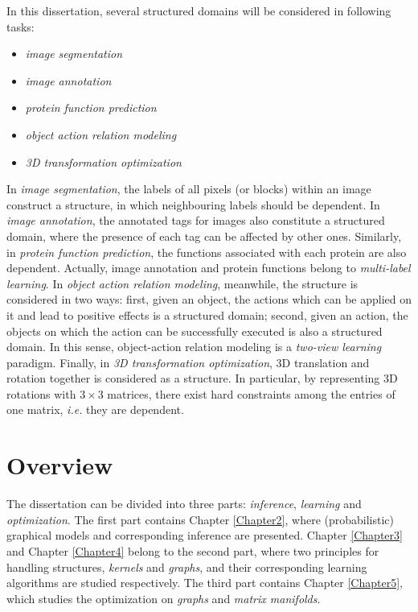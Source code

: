 In this dissertation, several structured domains will be considered in following tasks:  
\begin{itemize}
	\item \emph{image segmentation}
	\item \emph{image annotation}
	\item \emph{protein function prediction}
	\item \emph{object action relation modeling}
	\item \emph{3D transformation optimization} 
\end{itemize}
In \emph{image segmentation}, the labels of all pixels (or blocks) within an image construct a structure, in which neighbouring labels should be dependent.  
In \emph{image annotation}, the annotated tags for images also constitute a structured domain, where the presence of each tag can be affected by other ones.       
Similarly, in \emph{protein function prediction}, the functions associated with each protein are also dependent. Actually, image annotation and 
protein functions belong to \emph{multi-label learning}. In \emph{object action relation modeling}, meanwhile, the structure is 
considered in two ways: first, given an object, the actions which can be applied on it and lead to positive effects is a structured domain; second, given an action, 
the objects on which the action can be successfully executed is also a structured domain. In this sense, object-action relation modeling is  
a \emph{two-view learning} paradigm. Finally, in \emph{3D transformation optimization},  3D translation and rotation together is considered  
as a structure. In particular, by representing 3D rotations with $3\times 3$ matrices, there exist hard constraints among the entries of one matrix, \emph{i.e.} they 
are dependent.  



\section{Overview}
\label{sec:overview}
The dissertation can be divided into three parts: \emph{inference}, \emph{learning} and \emph{optimization}. The first part contains Chapter \ref{Chapter2}, where (probabilistic) graphical models 
and corresponding inference are presented. Chapter \ref{Chapter3} and Chapter \ref{Chapter4} belong to the second part, where two principles
for handling structures, \emph{kernels} and \emph{graphs}, and their corresponding learning algorithms are studied respectively. 
The third part contains Chapter \ref{Chapter5}, which studies the optimization on 
\emph{graphs} and \emph{matrix manifolds}.                    

